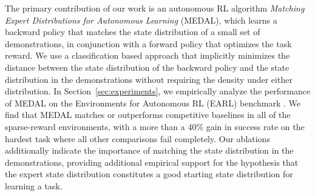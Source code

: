 \documentclass[nohyperref]{article}
\theoremstyle{plain}
\theoremstyle{definition}
\theoremstyle{remark}
\begin{document}
The primary contribution of our work is an autonomous RL algorithm \textit{Matching Expert Distributions for Autonomous Learning} (MEDAL), which learns a backward policy that matches the state distribution of a small set of demonstrations, in conjunction with a forward policy that optimizes the task reward. We use a classification based approach that implicitly minimizes the distance between the state distribution of the backward policy and the state distribution in the demonstrations without requiring the density under either distribution.
In Section~\ref{sec:experiments}, we empirically analyze the performance of MEDAL on the Environments for Autonomous RL (EARL) benchmark \citep{sharma2021autonomous}. We find that MEDAL matches or outperforms competitive baselines in all of the sparse-reward environments, with a more than a 40\% gain in success rate on the hardest task where all other comparisons fail completely. Our ablations additionally indicate the importance of matching the state distribution in the demonstrations, providing additional empirical support for the hypothesis that the expert state distribution constitutes a good starting state distribution for learning a task.
\end{document}
